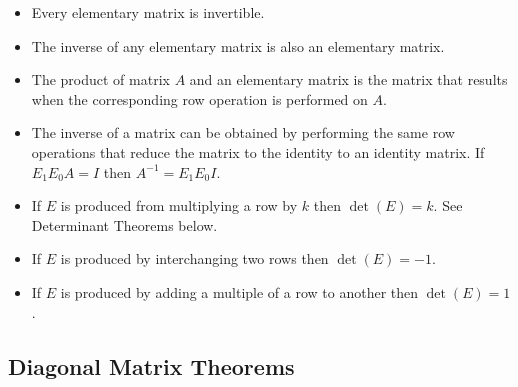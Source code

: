 \documentclass[12pt]{article}
\begin{document}
\begin{itemize}
    \item Every elementary matrix is invertible.
    \item The inverse of any elementary matrix is also an elementary matrix.
    \item The product of matrix $A$ and an elementary matrix is the matrix that results when the corresponding row operation is performed on $A$.
    \item The inverse of a matrix can be obtained by performing the same row operations that reduce the matrix to the identity to an identity matrix. If $E_1E_0A = I$ then $A^{-1} = E_1E_0I$.
    \item If $E$ is produced from multiplying a row by $k$ then $\det(E) = k$. See Determinant Theorems below.
    \item If $E$ is produced by interchanging two rows then $\det(E) = -1$.
    \item If $E$ is produced by adding a multiple of a row to another then $\det(E) = 1$.
\end{itemize}


\subsection{Diagonal Matrix Theorems}
\end{document}
